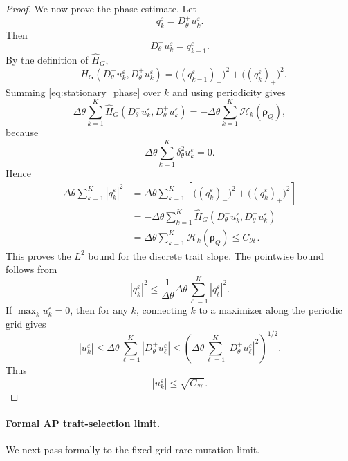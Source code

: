 \documentclass[11pt, dina4, amsfont12]{article}
\begin{document}
\begin{proof}
We now prove the phase estimate. Let
\[
    q_k^\varepsilon=D_\theta^+u_k^\varepsilon .
\]
Then
\[
    D_\theta^-u_k^\varepsilon=q_{k-1}^\varepsilon .
\]
By the definition of \(\widehat H_G\),
\[
    -\widehat H_G
    \left(
        D_\theta^-u_k^\varepsilon,
        D_\theta^+u_k^\varepsilon
    \right)
    =
    \bigl((q_{k-1}^\varepsilon)_{-}\bigr)^2
    +
    \bigl((q_k^\varepsilon)_{+}\bigr)^2 .
\]
Summing \eqref{eq:stationary_phase} over \(k\) and using periodicity gives
\[
    \Delta\theta
    \sum_{k=1}^K
    \widehat H_G
    \left(
        D_\theta^-u_k^\varepsilon,
        D_\theta^+u_k^\varepsilon
    \right)
    =
    -
    \Delta\theta
    \sum_{k=1}^K
    \mathcal H_k(\boldsymbol\rho_Q),
\]
because
\[
    \Delta\theta\sum_{k=1}^K
    \delta_\theta^2u_k^\varepsilon=0 .
\]
Hence
\[
\begin{aligned}
    \Delta\theta
    \sum_{k=1}^K
    |q_k^\varepsilon|^2
    &=
    \Delta\theta
    \sum_{k=1}^K
    \left[
        \bigl((q_k^\varepsilon)_{-}\bigr)^2
        +
        \bigl((q_k^\varepsilon)_{+}\bigr)^2
    \right]
    \\
    &=
    -
    \Delta\theta
    \sum_{k=1}^K
    \widehat H_G
    \left(
        D_\theta^-u_k^\varepsilon,
        D_\theta^+u_k^\varepsilon
    \right)
    \\
    &=
    \Delta\theta
    \sum_{k=1}^K
    \mathcal H_k(\boldsymbol\rho_Q)
    \le C_{\mathcal H}.
\end{aligned}
\]
This proves the \(L^2\) bound for the discrete trait slope. The pointwise
bound follows from
\[
    |q_k^\varepsilon|^2
    \le
    \frac1{\Delta\theta}
    \Delta\theta
    \sum_{\ell=1}^K |q_\ell^\varepsilon|^2 .
\]
If \(\max_k u_k^\varepsilon=0\), then for any \(k\), connecting \(k\) to a
maximizer along the periodic grid gives
\[
    |u_k^\varepsilon|
    \le
    \Delta\theta
    \sum_{\ell=1}^K |D_\theta^+u_\ell^\varepsilon|
    \le
    \left(
        \Delta\theta
        \sum_{\ell=1}^K |D_\theta^+u_\ell^\varepsilon|^2
    \right)^{1/2}.
\]
Thus
\[
    |u_k^\varepsilon|\le\sqrt{C_{\mathcal H}} .
\]
\end{proof}


\paragraph{Formal AP trait-selection limit.}

We next pass formally to the fixed-grid rare-mutation limit.
\end{document}
